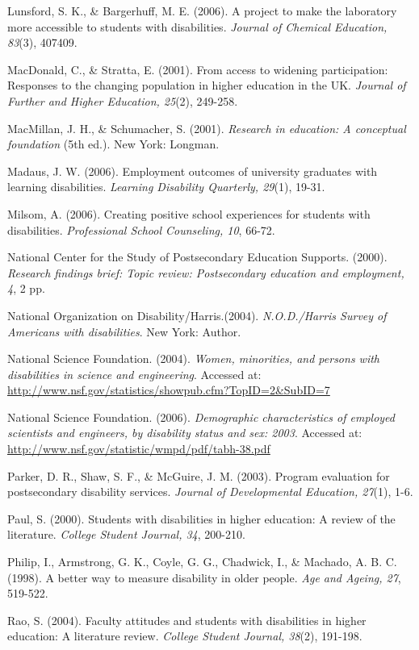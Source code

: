 \documentclass[11.5pt]{sig-alternate} %
\begin{document}
Lunsford, S. K., \& Bargerhuff, M. E. (2006). A project to make the laboratory more accessible to students with disabilities. \textit{Journal of Chemical Education, 83}(3), 407409.

MacDonald, C., \& Stratta, E. (2001). From access to widening participation: Responses to the changing population in higher education in the UK. \textit{Journal of Further and Higher Education, 25}(2), 249-258.

MacMillan, J. H., \& Schumacher, S. (2001). \textit{Research in education: A conceptual foundation} (5th ed.). New York: Longman.

Madaus, J. W. (2006). Employment outcomes of university graduates with learning disabilities. \textit{Learning Disability Quarterly, 29}(1), 19-31.

Milsom, A. (2006). Creating positive school experiences for students with disabilities. \textit{Professional School Counseling, 10}, 66-72.

National Center for the Study of Postsecondary Education Supports. (2000). \textit{Research findings brief: Topic review: Postsecondary education and employment, 4}, 2 pp.

National Organization on Disability/Harris.(2004). \textit{N.O.D./Harris Survey of Americans with disabilities}. New York: Author.

National Science Foundation. (2004). \textit{Women, minorities, and persons with disabilities in science and engineering}. Accessed at: \url{http://www.nsf.gov/statistics/showpub.cfm?TopID=2\&SubID=7}

National Science Foundation. (2006). \textit{Demographic characteristics of employed scientists and engineers, by disability status and sex: 2003}. Accessed at: \url{http://www.nsf.gov/statistic/wmpd/pdf/tabh-38.pdf}

Parker, D. R., Shaw, S. F., \& McGuire, J. M. (2003). Program evaluation for postsecondary disability services. \textit{Journal of Developmental Education, 27}(1), 1-6.

Paul, S. (2000). Students with disabilities in higher education: A review of the literature. \textit{College Student Journal, 34}, 200-210.

Philip, I., Armstrong, G. K., Coyle, G. G., Chadwick, I., \& Machado, A. B. C. (1998). A better way to measure disability in older people. \textit{Age and Ageing, 27}, 519-522.

Rao, S. (2004). Faculty attitudes and students with disabilities in higher education: A literature review. \textit{College Student Journal, 38}(2), 191-198.
\end{document}
